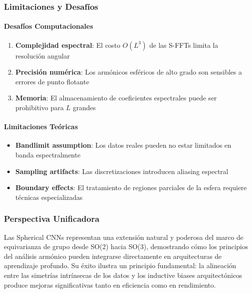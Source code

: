 \subsubsection{Limitaciones y Desafíos}

\paragraph{Desafíos Computacionales}

\begin{enumerate}
    \item \textbf{Complejidad espectral}: El costo $O(L^3)$ de las S-FFTs limita la resolución angular
    \item \textbf{Precisión numérica}: Los armónicos esféricos de alto grado son sensibles a errores de punto flotante
    \item \textbf{Memoria}: El almacenamiento de coeficientes espectrales puede ser prohibitivo para $L$ grandes
\end{enumerate}

\paragraph{Limitaciones Teóricas}

\begin{itemize}
    \item \textbf{Bandlimit assumption}: Los datos reales pueden no estar limitados en banda espectralmente
    \item \textbf{Sampling artifacts}: Las discretizaciones introducen aliasing espectral
    \item \textbf{Boundary effects}: El tratamiento de regiones parciales de la esfera requiere técnicas especializadas
\end{itemize}

\subsubsection{Perspectiva Unificadora}

Las Spherical CNNs representan una extensión natural y poderosa del marco de equivarianza de grupo desde SO(2) hacia SO(3), demostrando cómo los principios del análisis armónico pueden integrarse directamente en arquitecturas de aprendizaje profundo. Su éxito ilustra un principio fundamental: la alineación entre las simetrías intrínsecas de los datos y los inductive biases arquitectónicos produce mejoras significativas tanto en eficiencia como en rendimiento.

